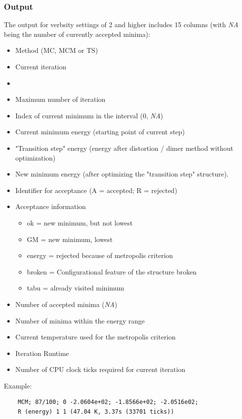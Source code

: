 \documentclass[10pt,a4paper]{article} %
\begin{document}
	\subsubsection{Output}
	The output for verbsity settings of 2 and higher includes 15 columns (with \textit{NA} being the number of currently accepted minima):\\
	\begin{itemize}
		\item Method (\ac{MC}, \ac{MCM} or \ac{TS})
		\item Current iteration
		\item {} 
		\item Maximum number of iteration
		\item Index of current minimum in the interval (0, \textit{NA})
		\item Current minimum energy (starting point of current step)
		\item "Transition step" energy (energy after distortion / dimer method without optimization)
		\item New minimum energy (after optimizing the "transition step" structure).
		\item Identifier for acceptance (A = accepted; R = rejected)
		\item Acceptance information
		\begin{itemize}
			\item ok = new minimum, but not lowest
			\item GM = new minimum, lowest
			\item energy = rejected because of metropolis criterion
			\item broken = Configurational feature of the structure broken
			\item tabu = already visited minimum
		\end{itemize}
		\item Number of accepted minima (\textit{NA})
		\item Number of minima within the energy range
		\item Current temperature used for the metropolis criterion
		\item Iteration Runtime
		\item Number of CPU clock ticks required for current iteration
	\end{itemize}
	
	Example:\\
	\begin{lstlisting}
	MCM; 87/100; 0 -2.0604e+02; -1.8566e+02; -2.0516e02;
	R (energy) 1 1 (47.04 K, 3.37s (33701 ticks))
	\end{lstlisting}
\end{document}
